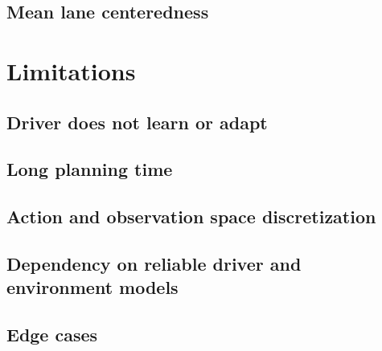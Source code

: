




\subsection{Mean lane centeredness}









\section{Limitations}
\label{sec:limitations}
\subsection{Driver does not learn or adapt}
\subsection{Long planning time}
\subsection{Action and observation space discretization}
\subsection{Dependency on reliable driver and environment models}
\subsection{Edge cases}